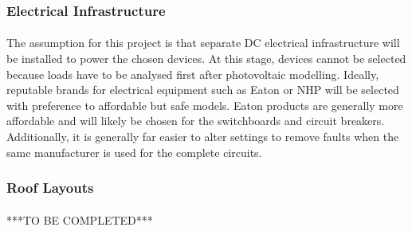 \subsubsection{Electrical Infrastructure}

\paragraph{}
The assumption for this project is that separate DC electrical infrastructure will be installed to power the chosen devices. At this stage, devices cannot be selected because loads have to be analysed first after photovoltaic modelling. Ideally, reputable brands for electrical equipment such as Eaton or NHP will be selected with preference to affordable but safe models. Eaton products are generally more affordable and will likely be chosen for the switchboards and circuit breakers. Additionally, it is generally far easier to alter settings to remove faults when the same manufacturer is used for the complete circuits.  

\subsubsection{Roof Layouts}

\paragraph{}  
***TO BE COMPLETED*** 
 
